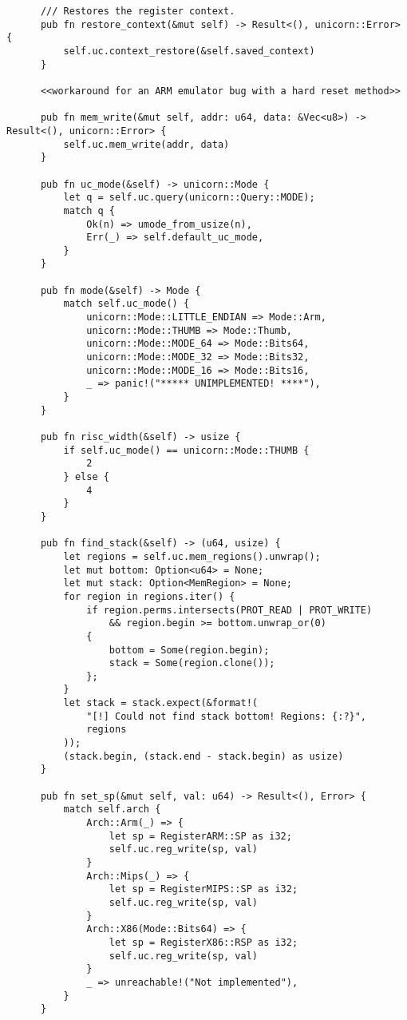 \documentclass[11pt]{article}
\begin{document}
\begin{lstlisting}
      /// Restores the register context.
      pub fn restore_context(&mut self) -> Result<(), unicorn::Error> {
          self.uc.context_restore(&self.saved_context)
      }

      <<workaround for an ARM emulator bug with a hard reset method>>

      pub fn mem_write(&mut self, addr: u64, data: &Vec<u8>) -> Result<(), unicorn::Error> {
          self.uc.mem_write(addr, data)
      }

      pub fn uc_mode(&self) -> unicorn::Mode {
          let q = self.uc.query(unicorn::Query::MODE);
          match q {
              Ok(n) => umode_from_usize(n),
              Err(_) => self.default_uc_mode,
          }
      }

      pub fn mode(&self) -> Mode {
          match self.uc_mode() {
              unicorn::Mode::LITTLE_ENDIAN => Mode::Arm,
              unicorn::Mode::THUMB => Mode::Thumb,
              unicorn::Mode::MODE_64 => Mode::Bits64,
              unicorn::Mode::MODE_32 => Mode::Bits32,
              unicorn::Mode::MODE_16 => Mode::Bits16,
              _ => panic!("***** UNIMPLEMENTED! ****"),
          }
      }

      pub fn risc_width(&self) -> usize {
          if self.uc_mode() == unicorn::Mode::THUMB {
              2
          } else {
              4
          }
      }

      pub fn find_stack(&self) -> (u64, usize) {
          let regions = self.uc.mem_regions().unwrap();
          let mut bottom: Option<u64> = None;
          let mut stack: Option<MemRegion> = None;
          for region in regions.iter() {
              if region.perms.intersects(PROT_READ | PROT_WRITE)
                  && region.begin >= bottom.unwrap_or(0)
              {
                  bottom = Some(region.begin);
                  stack = Some(region.clone());
              };
          }
          let stack = stack.expect(&format!(
              "[!] Could not find stack bottom! Regions: {:?}",
              regions
          ));
          (stack.begin, (stack.end - stack.begin) as usize)
      }

      pub fn set_sp(&mut self, val: u64) -> Result<(), Error> {
          match self.arch {
              Arch::Arm(_) => {
                  let sp = RegisterARM::SP as i32;
                  self.uc.reg_write(sp, val)
              }
              Arch::Mips(_) => {
                  let sp = RegisterMIPS::SP as i32;
                  self.uc.reg_write(sp, val)
              }
              Arch::X86(Mode::Bits64) => {
                  let sp = RegisterX86::RSP as i32;
                  self.uc.reg_write(sp, val)
              }
              _ => unreachable!("Not implemented"),
          }
      }


\end{lstlisting}
\end{document}
